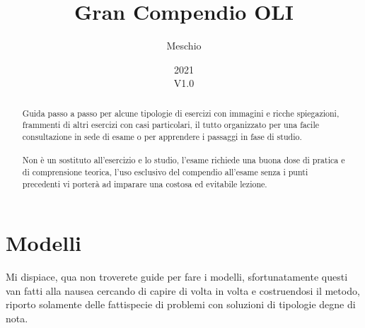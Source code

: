 \documentclass{article}
\title{Gran Compendio OLI}
\author{Meschio}
\date{2021\\V1.0}
\begin{document}
\maketitle

\begin{abstract}
Guida passo a passo per alcune tipologie di esercizi con immagini e ricche spiegazioni, frammenti di altri esercizi con casi particolari, il tutto organizzato per una facile consultazione in sede di esame o per apprendere i passaggi in fase di studio.\\
\\
Non è un sostituto all'esercizio e lo studio, l'esame richiede una buona dose di pratica e di comprensione teorica, l'uso esclusivo del compendio all'esame senza i punti precedenti vi porterà ad imparare una costosa ed evitabile lezione.
\end{abstract}

\tableofcontents

\section{Modelli}
Mi dispiace, qua non troverete guide per fare i modelli, sfortunatamente questi van fatti alla nausea cercando di capire di volta in volta e costruendosi il metodo, riporto solamente delle fattispecie di problemi con soluzioni di tipologie degne di nota.
\end{document}
